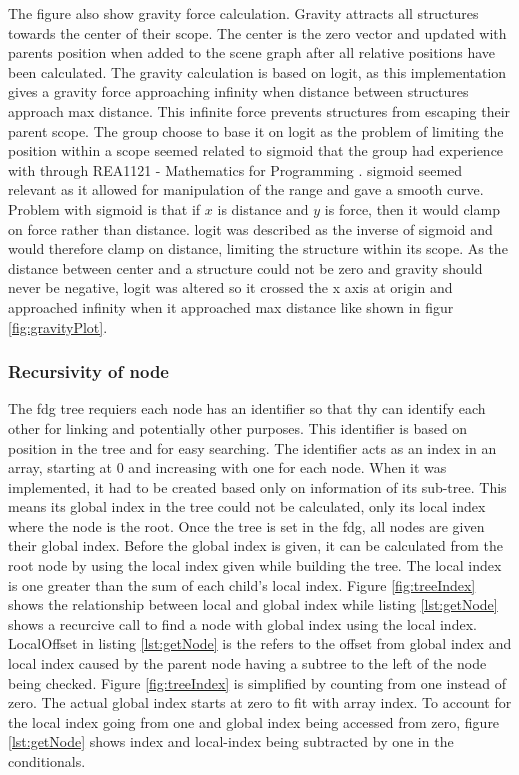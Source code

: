 
The figure also show gravity force calculation. Gravity attracts all structures towards the center of their scope. The center is the zero vector and updated with parents position when added to the scene graph after all relative positions have been calculated. The gravity calculation is based on \gls{logit}, as this implementation gives a gravity force approaching infinity when distance between structures approach max distance. This infinite force prevents structures from escaping their parent scope. The group choose to base it on \gls{logit} as the problem of limiting the position within a scope seemed related to \gls{sigmoid} that the group had experience with through REA1121 - Mathematics for Programming \cite{course:progMath}. \Gls{sigmoid} seemed relevant as it allowed for manipulation of the range and gave a smooth curve. Problem with \gls{sigmoid} is that if $x$ is distance and $y$ is force, then it would clamp on force rather than distance. \gls{logit} was described as the inverse of \gls{sigmoid} and would therefore clamp on distance, limiting the structure within its scope. As the distance between center and a structure could not be zero and gravity should never be negative, \gls{logit} was altered so it crossed the x axis at origin and approached infinity when it approached max distance like shown in figur \ref{fig:gravityPlot}.

\subsubsection{Recursivity of node}


The \gls{fdg} tree requiers each node has an identifier so that thy can identify each other for linking and potentially other purposes. This identifier is based on position in the tree and for easy searching. The identifier acts as an index in an array, starting at 0 and increasing with one for each node. When it was implemented, it had to be created based only on information of its sub-tree. This means its global index in the tree could not be calculated, only its local index where the node is the root. Once the tree is set in the \gls{fdg}, all nodes are given their global index. Before the global index is given, it can be calculated from the root node by using the local index given while building the tree. The local index is one greater than the sum of each child's local index. Figure \ref{fig:treeIndex} shows the relationship between local and global index while listing \ref{lst:getNode} shows a recurcive call to find a node with global index using the local index. LocalOffset in listing \ref{lst:getNode} is the refers to the offset from global index and local index caused by the parent node having a subtree to the left of the node being checked. Figure \ref{fig:treeIndex} is simplified by counting from  one instead of zero. The actual global index starts at zero to fit with array index. To account for the local index going from one and global index being accessed from zero, figure \ref{lst:getNode} shows index and local-index being subtracted by one in the conditionals.

